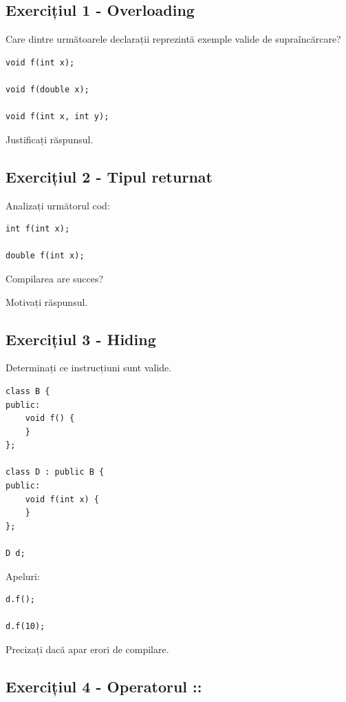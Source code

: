 \documentclass[12pt,a4paper]{article}
\begin{document}
\subsection{Exercițiul 1 - Overloading}

Care dintre următoarele declarații reprezintă exemple valide de supraîncărcare?

\begin{verbatim}
void f(int x);

void f(double x);

void f(int x, int y);
\end{verbatim}

Justificați răspunsul.

\subsection{Exercițiul 2 - Tipul returnat}

Analizați următorul cod:

\begin{verbatim}
int f(int x);

double f(int x);
\end{verbatim}

Compilarea are succes?

Motivați răspunsul.

\subsection{Exercițiul 3 - Hiding}

Determinați ce instrucțiuni sunt valide.

\begin{verbatim}
class B {
public:
    void f() {
    }
};

class D : public B {
public:
    void f(int x) {
    }
};

D d;
\end{verbatim}

Apeluri:

\begin{verbatim}
d.f();

d.f(10);
\end{verbatim}

Precizați dacă apar erori de compilare.

\subsection{Exercițiul 4 - Operatorul ::}
\end{document}
